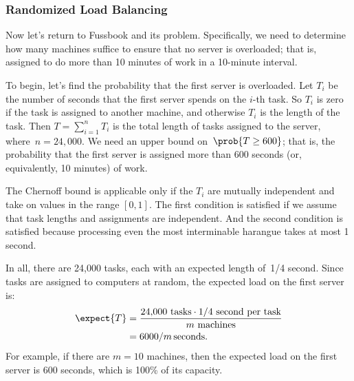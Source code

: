 \subsubsection{Randomized Load Balancing}

Now let's return to Fussbook and its  problem.
Specifically, we need to determine how many machines suffice to ensure
that no server is overloaded; that is, assigned to do more than 10
minutes of work in a 10-minute interval.

To begin, let's find the probability that the first server is
overloaded.  Let $T_i$ be the number of seconds that the first server
spends on the $i$-th task.  So $T_i$ is zero if the task is assigned
to another machine, and otherwise $T_i$ is the length of the task.
Then $T = \sum_{i = 1}^n T_i$ is the total length of tasks assigned to
the server, where~$n = 24{,}000$.  We need an upper bound on~$\prob{T
  \geq 600}$; that is, the probability that the first server is
assigned more than 600 seconds (or, equivalently, 10 minutes) of work.

The Chernoff bound is applicable only if the $T_i$ are mutually
independent and take on values in the range $[0, 1]$.  The first
condition is satisfied if we assume that task lengths and assignments
are independent.  And the second condition is satisfied because
processing even the most interminable harangue takes at most 1 second.

In all, there are 24,000 tasks, each with an expected length of~1/4
second.  Since tasks are assigned to computers at random, the expected
load on the first server is:
\begin{align*}
\expect{T} & = \frac{24{,}000 \mbox{ tasks} \cdot 1/4 \mbox{ second per task}}
  {m \mbox{ machines}} \\
  & = 6000 / m\,\text{seconds}.
\end{align*}
For example, if there are $m = 10$ machines, then the expected load on
the first server is 600 seconds, which is 100\% of its capacity.

